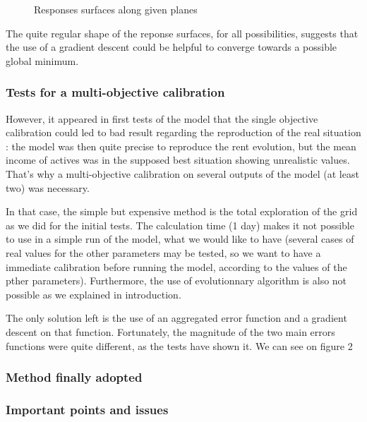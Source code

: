 \documentclass[english]{article}
\begin{document}
\begin{figure}
\caption{Responses surfaces along given planes}


\end{figure}


The quite regular shape of the reponse surfaces, for all possibilities,
suggests that the use of a gradient descent could be helpful to converge
towards a possible global minimum.


\subsubsection*{Tests for a multi-objective calibration}

However, it appeared in first tests of the model that the single objective
calibration could led to bad result regarding the reproduction of
the real situation : the model was then quite precise to reproduce
the rent evolution, but the mean income of actives was in the supposed
best situation showing unrealistic values. That's why a multi-objective
calibration on several outputs of the model (at least two) was necessary.

In that case, the simple but expensive method is the total exploration
of the grid as we did for the initial tests. The calculation time
(1 day) makes it not possible to use in a simple run of the model,
what we would like to have (several cases of real values for the other
parameters may be tested, so we want to have a immediate calibration
before running the model, according to the values of the pther parameters).
Furthermore, the use of evolutionnary algorithm is also not possible
as we explained in introduction.

The only solution left is the use of an aggregated error function
and a gradient descent on that function. Fortunately, the magnitude
of the two main errors functions were quite different, as the tests
have shown it. We can see on figure 2


\subsubsection*{Method finally adopted}


\subsubsection*{Important points and issues}
\end{document}
